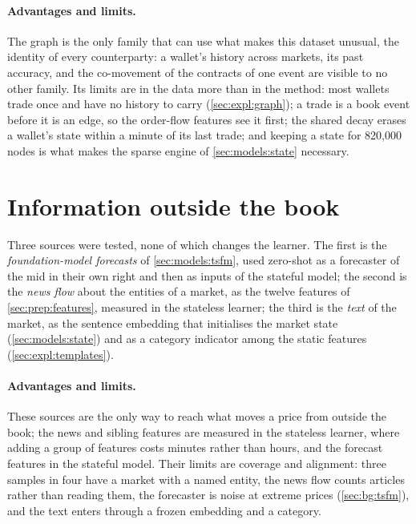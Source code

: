 \paragraph{Advantages and limits.}  The graph is the only family that can use what makes
this dataset unusual, the identity of every counterparty: a wallet's history across
markets, its past accuracy, and the co-movement of the contracts of one event are visible
to no other family.  Its limits are in the data more than in the method: most wallets trade once and
have no history to carry (\cref{sec:expl:graph}); a trade is a book event before it is an
edge, so the order-flow features see it first; the shared decay erases a wallet's state
within a minute of its last trade; and keeping a state for 820{,}000 nodes is what makes
the sparse engine of \cref{sec:models:state} necessary.

\section{Information outside the book}
\label{sec:models:external}

Three sources were tested, none of which changes the learner.  The first is the
\emph{foundation-model forecasts} of \cref{sec:models:tsfm}, used zero-shot as a forecaster
of the mid in their own right and then as inputs of the stateful model; the second is the
\emph{news flow} about the entities of a market, as the twelve features of
\cref{sec:prep:features}, measured in the stateless learner; the third is the \emph{text} of
the market, as the sentence embedding that initialises the market state
(\cref{sec:models:state}) and as a category indicator among the static features
(\cref{sec:expl:templates}).

\paragraph{Advantages and limits.}  These sources are the only way to reach what moves a
price from outside the book; the news and sibling features are measured in the stateless
learner, where adding a group of features costs minutes rather than hours, and the forecast
features in the stateful model.  Their limits are coverage and
alignment: three samples in four have a market with a named entity, the news flow counts
articles rather than reading them, the forecaster is noise at extreme prices
(\cref{sec:bg:tsfm}), and the text enters through a frozen embedding and a category.
